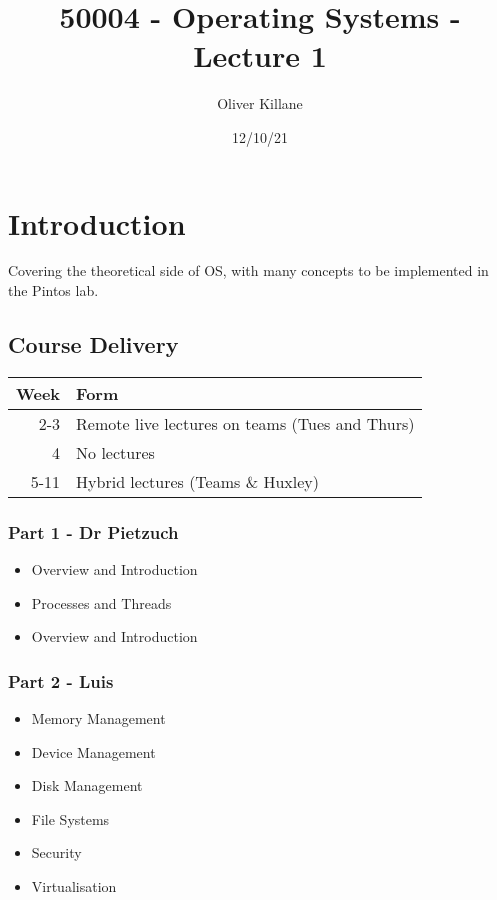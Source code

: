 \documentclass{report}
\title{50004 - Operating Systems - Lecture 1}
\author{Oliver Killane}
\date{12/10/21}
\begin{document}
\maketitle
{}
\section*{Introduction}
Covering the theoretical side of OS, with many concepts to be implemented in the Pintos lab.
\subsection*{Course Delivery}
\begin{center}
	\begin{tabular}{r l}
		Week & Form                                           \\
		\hline
		2-3  & Remote live lectures on teams (Tues and Thurs) \\
		4    & No lectures                                    \\
		5-11 & Hybrid lectures (Teams \& Huxley)              \\
	\end{tabular}
\end{center}
\subsubsection*{Part 1 - Dr Pietzuch}
\begin{itemize}
	\item Overview and Introduction
	\item Processes and Threads
	\item Overview and Introduction
\end{itemize}
\subsubsection*{Part 2 - Luis}
\begin{itemize}
	\item Memory Management
	\item Device Management
	\item Disk Management
	\item File Systems
	\item Security
	\item Virtualisation
\end{itemize}
\end{document}
